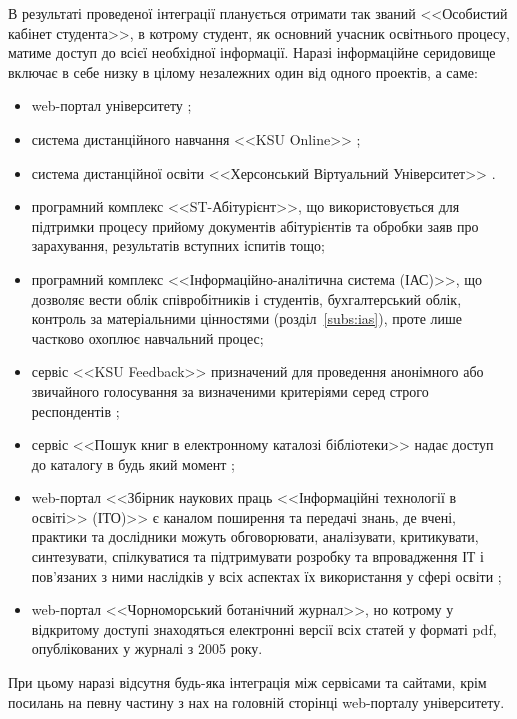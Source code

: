 В результаті проведеної інтеграції планується отримати так званий <<Особистий кабінет студента>>, в котрому студент, як основний учасник освітнього процесу, матиме доступ до всієї необхідної інформації. Наразі інформаційне серидовище включає в себе низку в цілому незалежних один від одного проектів, а саме:
\begin{itemize}
	\item web-портал університету \cite{KspuEdu};
	\item система дистанційного навчання <<KSU Online>> \cite{KsuOnline};
	\item система дистанційної освіти <<Херсонський Віртуальний Університет>> \cite{KsuDis}.
	\item програмний комплекс <<ST-Абітурієнт>>, що використовується для підтримки процесу прийому документів абітурієнтів та обробки заяв про зарахування, результатів вступних іспитів тощо;
	\item програмний комплекс <<Інформаційно-аналітична система (ІАС)>>, що дозволяє вести облік співробітників і студентів, бухгалтерський облік, контроль за матеріальними цінностями (розділ~\ref{subs:ias}), проте лише частково охоплює навчальний процес;
	\item сервіс <<KSU Feedback>> призначений для проведення анонімного або звичайного голосування за визначеними критеріями серед строго респондентів \cite{KsuFeedback};
	\item сервіс  <<Пошук книг в електронному каталозі бібліотеки>> надає доступ до каталогу в будь який момент \cite{eLibrary};
	\item web-портал <<Збірник наукових праць <<Інформаційні технології в освіті>> (ІТО)>> є каналом поширення та передачі знань, де вчені, практики та дослідники можуть обговорювати, аналізувати, критикувати, синтезувати, спілкуватися та підтримувати розробку та впровадження ІТ і пов'язаних з ними наслідків у всіх аспектах їх використання у сфері освіти \cite{ITO};
	\item web-портал <<Чорноморський ботанiчний журнал>>, но котрому у відкритому доступі знаходяться електронні версії всіх статей у форматі pdf, опублікованих у журналі з 2005 року.
\end{itemize}

При цьому наразі відсутня будь-яка інтеграція між сервісами та сайтами, крім посилань на певну частину з нах на головній сторінці web-порталу університету.
